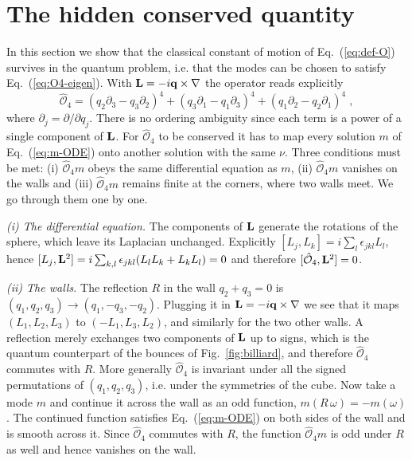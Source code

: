 \section{The hidden conserved quantity} \label{S:sec-conserved}

In this section we show that the classical constant of motion of Eq.~(\ref{eq:def-O}) survives in the quantum problem, i.e. that the modes can be chosen to satisfy Eq.~(\ref{eq:O4-eigen}). With $\vb{L} = - i \vb{q} \times \nabla$ the operator reads explicitly
\begin{equation} \label{S:O4-explicit}
    \hat{\mathcal{O}}_4 = \left( q_2 \partial_3 - q_3 \partial_2 \right)^4 + \left( q_3 \partial_1 - q_1 \partial_3 \right)^4 + \left( q_1 \partial_2 - q_2 \partial_1 \right)^4 \;,
\end{equation}
where $\partial_j = \partial/\partial q_j$. There is no ordering ambiguity since each term is a power of a single component of $\vb{L}$. For $\hat{\mathcal{O}}_4$ to be conserved it has to map every solution $m$ of Eq.~(\ref{eq:m-ODE}) onto another solution with the same $\nu$. Three conditions must be met: (i) $\hat{\mathcal{O}}_4 m$ obeys the same differential equation as $m$, (ii) $\hat{\mathcal{O}}_4 m$ vanishes on the walls and (iii) $\hat{\mathcal{O}}_4 m$ remains finite at the corners, where two walls meet. We go through them one by one.

\emph{(i) The differential equation.} The components of $\vb{L}$ generate the rotations of the sphere, which leave its Laplacian unchanged. Explicitly $[L_j, L_k] = i \sum_l \epsilon_{jkl} L_l$, hence $[L_j, \vb{L}^2] = i \sum_{k,l} \epsilon_{jkl} (L_l L_k + L_k L_l) = 0$ and therefore $[\hat{\mathcal{O}}_4, \vb{L}^2] = 0$.

\emph{(ii) The walls.} The reflection $R$ in the wall $q_2 + q_3 = 0$ is $(q_1, q_2, q_3) \to (q_1, -q_3, -q_2)$. Plugging it in $\vb{L} = - i \vb{q} \times \nabla$ we see that it maps $(L_1, L_2, L_3)$ to $(-L_1, L_3, L_2)$, and similarly for the two other walls. A reflection merely exchanges two components of $\vb{L}$ up to signs, which is the quantum counterpart of the bounces of Fig.~\ref{fig:billiard}, and therefore $\hat{\mathcal{O}}_4$ commutes with $R$. More generally $\hat{\mathcal{O}}_4$ is invariant under all the signed permutations of $(q_1, q_2, q_3)$, i.e. under the symmetries of the cube. Now take a mode $m$ and continue it across the wall as an odd function, $m(R \, \omega) = - m(\omega)$. The continued function satisfies Eq.~(\ref{eq:m-ODE}) on both sides of the wall and is smooth across it. Since $\hat{\mathcal{O}}_4$ commutes with $R$, the function $\hat{\mathcal{O}}_4 m$ is odd under $R$ as well and hence vanishes on the wall.

